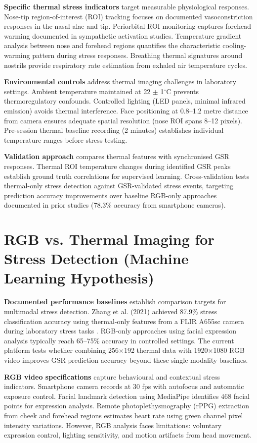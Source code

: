 \textbf{Specific thermal stress indicators} target measurable physiological responses. Nose-tip region-of-interest (ROI) tracking focuses on documented vasoconstriction responses in the nasal alae and tip. Periorbital ROI monitoring captures forehead warming documented in sympathetic activation studies. Temperature gradient analysis between nose and forehead regions quantifies the characteristic cooling-warming pattern during stress responses. Breathing thermal signatures around nostrils provide respiratory rate estimation from exhaled air temperature cycles.

\textbf{Environmental controls} address thermal imaging challenges in laboratory settings. Ambient temperature maintained at 22 $\pm$ 1$^\circ$C prevents thermoregulatory confounds. Controlled lighting (LED panels, minimal infrared emission) avoids thermal interference. Face positioning at 0.8--1.2 metre distance from camera ensures adequate spatial resolution (nose ROI spans 8--12 pixels). Pre-session thermal baseline recording (2 minutes) establishes individual temperature ranges before stress testing.

\textbf{Validation approach} compares thermal features with synchronised GSR responses. Thermal ROI temperature changes during identified GSR peaks establish ground truth correlations for supervised learning. Cross-validation tests thermal-only stress detection against GSR-validated stress events, targeting prediction accuracy improvements over baseline RGB-only approaches documented in prior studies (78.3\% accuracy from smartphone cameras).

\section{RGB vs. Thermal Imaging for Stress Detection (Machine Learning Hypothesis)}
\textbf{Documented performance baselines} establish comparison targets for multimodal stress detection. Zhang et al. (2021) achieved 87.9\% stress classification accuracy using thermal-only features from a FLIR A655sc camera during laboratory stress tasks \cite{ref5}. RGB-only approaches using facial expression analysis typically reach 65--75\% accuracy in controlled settings. The current platform tests whether combining 256$\times$192 thermal data with 1920$\times$1080 RGB video improves GSR prediction accuracy beyond these single-modality baselines.

\textbf{RGB video specifications} capture behavioural and contextual stress indicators. Smartphone camera records at 30 fps with autofocus and automatic exposure control. Facial landmark detection using MediaPipe identifies 468 facial points for expression analysis. Remote photoplethysmography (rPPG) extraction from cheek and forehead regions estimates heart rate using green channel pixel intensity variations. However, RGB analysis faces limitations: voluntary expression control, lighting sensitivity, and motion artifacts from head movement.

